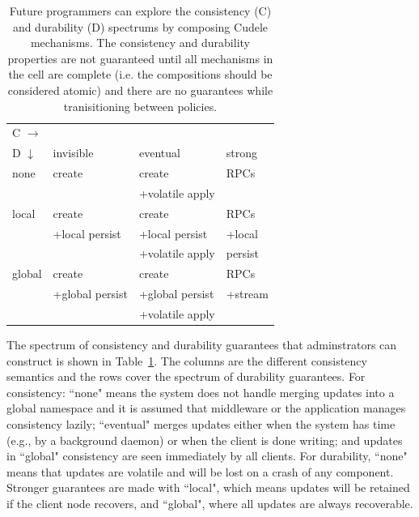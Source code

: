\begin{table}[t]
\begin{center}
\caption{Future programmers can explore the consistency (C) and
durability (D) spectrums by composing Cudele mechanisms. The consistency
and durability properties are not guaranteed until all mechanisms in the cell
are complete (i.e. the compositions should be considered atomic) and there are
no guarantees while tranisitioning between policies. \label{table:spectrum}}
\begin{tabular}{ l | l | l | l }
  C \(\rightarrow\) &&& \\  
  D \(\downarrow\)  & invisible         & eventual        & strong  \\\hline
  none                       & create            & create          & RPCs    \\
                             &                   & +volatile apply &         \\\hdashline
  local                      & create            & create          & RPCs    \\
                             & +local persist    & +local persist  & +local  \\
                             &                   & +volatile apply &  persist\\\hdashline
  global                     & create            & create          & RPCs    \\
                             & +global persist   & +global persist & +stream \\
                             &                   & +volatile apply &         \\
\end{tabular}
\end{center}
\end{table}

The spectrum of consistency and durability guarantees that adminstrators
can construct is shown in Table~\ref{table:spectrum}. The columns are the
different consistency semantics and the rows cover the spectrum of durability
guarantees. For consistency: ``none" means the system does not handle
merging updates into a global namespace and it is assumed that middleware or
the application manages consistency lazily; ``eventual" merges updates either
when the system has time (e.g., by a background daemon) or when the client is
done writing; and updates in ``global" consistency are seen immediately by all
clients. For durability, ``none" means that updates are volatile and will
be lost on a crash of any component. Stronger guarantees are made with
``local", which means updates will be retained if the client node recovers, and
``global", where all updates are always recoverable.

